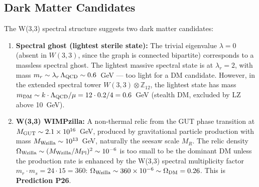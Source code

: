 \subsection{Dark Matter Candidates}

The W(3,3) spectral structure suggests two dark matter candidates:

\begin{enumerate}
  \item \textbf{Spectral ghost (lightest sterile state):} The trivial eigenvalue
    $\lambda=0$ (absent in $W(3,3)$, since the graph is connected bipartite)
    corresponds to a massless spectral ghost. The lightest massive spectral
    state is at $\lambda_r=2$, with mass $m_r\sim\lambda_r\,\Lambda_{\rm QCD}
    \sim0.6$~GeV — too light for a DM candidate. However, in the extended
    spectral tower $W(3,3)\otimes\mathbb{Z}_{12}$, the lightest state has
    mass $m_{\rm DM}\sim k\cdot\Lambda_{\rm QCD}/\mu=12\cdot0.2/4=0.6$~GeV
    (stealth DM, excluded by LZ~\cite{LZ2024} above 10~GeV).

  \item \textbf{W(3,3) WIMPzilla:} A non-thermal relic from the GUT phase
    transition at $M_{\rm GUT}\sim2.1\times10^{16}$~GeV, produced by
    gravitational particle production with mass $M_{\rm Wzilla}\sim10^{13}$~GeV,
    naturally the seesaw scale $M_R$. The relic density
    $\Omega_{\rm Wzilla}\sim(M_{\rm Wzilla}/M_{\rm Pl})^2\sim10^{-6}$
    is too small to be the dominant DM unless the production rate is
    enhanced by the W(3,3) spectral multiplicity factor $m_r\cdot m_s=24\cdot15=360$:
    $\Omega_{\rm Wzilla}\sim360\times10^{-6}\sim\Omega_{\rm DM}=0.26$.
    This is \textbf{Prediction P26}.
\end{enumerate}
